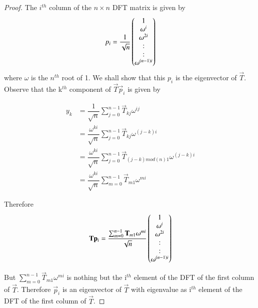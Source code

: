 \documentclass[journal,12pt,twocolumn]{IEEEtran}
\begin{document}
\begin{proof}
The $i^{th}$ column of the $n\times n$ DFT matrix is given by
\begin{equation}
    p_i = \dfrac{1}{\sqrt{n}}\begin{pmatrix}1 \\ \omega^{i} \\ \omega^{2i} \\ : \\ : \\ \omega^{(n-1)i}\end{pmatrix} 
\end{equation}
where $\omega$ is the $n^{th}$ root of 1. We shall show that this $p_i$ is the eigenvector of $\vec{T}$. Observe that the k$^{th}$ component of $\vec{T}\vec{p}_i$ is given by

\begin{align}
    y_k &= \dfrac{1}{\sqrt{n}}\sum_{j = 0}^{n-1}\vec{T}_{kj} \omega^{ij}\\ 
    &= \dfrac{\omega^{ki}}{\sqrt{n}}\sum_{j = 0}^{n-1}\vec{T}_{kj}\omega^{(j-k)i}\\
    &= \dfrac{\omega^{ki}}{\sqrt{n}}\sum_{j = 0}^{n-1}\vec{T}_{(j-k)mod(n)1}\omega^{(j-k)i}\\
    &= \dfrac{\omega^{ki}}{\sqrt{n}}\sum_{m = 0}^{n-1}\vec{T}_{m1}\omega^{mi}
\end{align}

Therefore 
\begin{equation}
    \mathbf{T}\mathbf{p}_i = \dfrac{\sum_{m = 0}^{n-1}\mathbf{T}_{m1}\omega^{mi}}{\sqrt{n}}\begin{pmatrix}1 \\ \omega^{i} \\ \omega^{2i} \\ : \\ : \\ \omega^{(n-1)i}\end{pmatrix}
\end{equation}

But $\sum_{m = 0}^{n-1}\vec{T}_{m1}\omega^{mi}$ is nothing but the i$^{th}$ element of the DFT of the first column of $\vec{T}$. Therefore $\vec{p}_i$ is an eigenvector of $\vec{T}$ with eigenvalue as i$^{th}$ element of the DFT of the first column of $\vec{T}$.
\end{proof}
 
\end{document}
